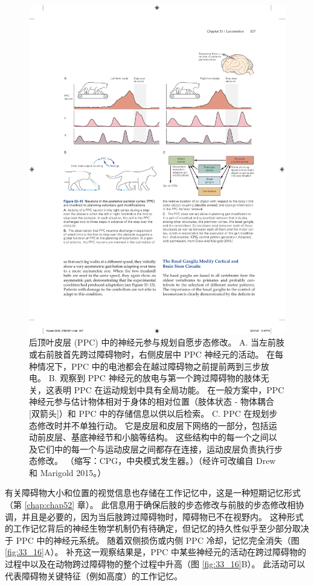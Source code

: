 \begin{figure}[htbp]
	\centering
	\includegraphics[width=0.95\linewidth]{chap33/fig_33_15}
	\caption{后顶叶皮层 (PPC) 中的神经元参与规划自愿步态修改。 A. 当左前肢或右前肢首先跨过障碍物时，右侧皮层中 PPC 神经元的活动。 在每种情况下，PPC 中的电池都会在越过障碍物之前提前两到三步放电。 B. 观察到 PPC 神经元的放电与第一个跨过障碍物的肢体无关，这表明 PPC 在运动规划中具有全局功能。 在一般方案中，PPC 神经元参与估计物体相对于身体的相对位置（肢体状态 - 物体耦合 [双箭头]）和 PPC 中的存储信息以供以后检索。 C. PPC 在规划步态修改时并不单独行动。 它是皮层和皮层下网络的一部分，包括运动前皮层、基底神经节和小脑等结构。 这些结构中的每一个之间以及它们中的每一个与运动皮层之间都存在连接，运动皮层负责执行步态修改。 （缩写：CPG，中央模式发生器。）（经许可改编自 Drew 和 Marigold 2015。）}
	\label{fig:33_15}
\end{figure}


有关障碍物大小和位置的视觉信息也存储在工作记忆中，这是一种短期记忆形式（第 \ref{chap:chap52} 章）。
此信息用于确保后肢的步态修改与前肢的步态修改相协调，并且是必要的，因为当后肢跨过障碍物时，障碍物已不在视野内。
这种形式的工作记忆背后的神经生物学机制仍有待确定，但记忆的持久性似乎至少部分取决于 PPC 中的神经元系统。
随着双侧损伤或内侧 PPC 冷却，记忆完全消失（图 \ref{fig:33_16}A）。
补充这一观察结果是，PPC 中某些神经元的活动在跨过障碍物的过程中以及在动物跨过障碍物的整个过程中升高（图 \ref{fig:33_16}B）。
此活动可以代表障碍物关键特征（例如高度）的工作记忆。


